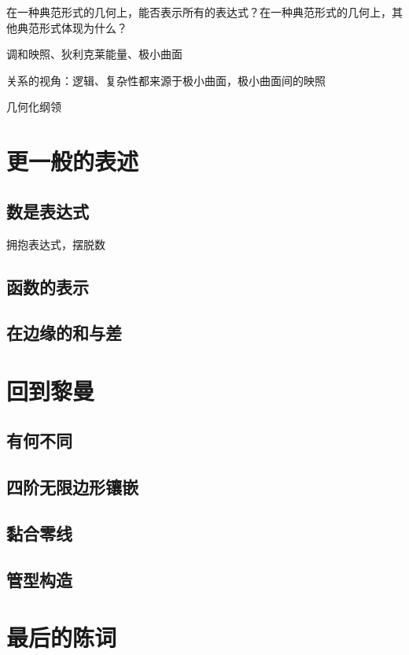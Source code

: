 \documentclass[a4paper,12pt]{article}
\numberwithin{definition}{section}
\numberwithin{lemma}{section}
\numberwithin{proposition}{section}
\numberwithin{theorem}{section}
\numberwithin{grammar}{section}
\numberwithin{program}{section}
\numberwithin{convention}{section}
\numberwithin{corollary}{section}
\begin{document}
在一种典范形式的几何上，能否表示所有的表达式？在一种典范形式的几何上，其他典范形式体现为什么？

调和映照、狄利克莱能量、极小曲面

关系的视角：逻辑、复杂性都来源于极小曲面，极小曲面间的映照

几何化纲领

\newpage

\section{更一般的表述}

\subsection{数是表达式}

拥抱表达式，摆脱数

\subsection{函数的表示}

\subsection{在边缘的和与差}

\newpage

\section{回到黎曼}

\subsection{有何不同}

\subsection{四阶无限边形镶嵌}

\subsection{黏合零线}

\subsection{管型构造}

\newpage

\section{最后的陈词}
\end{document}
